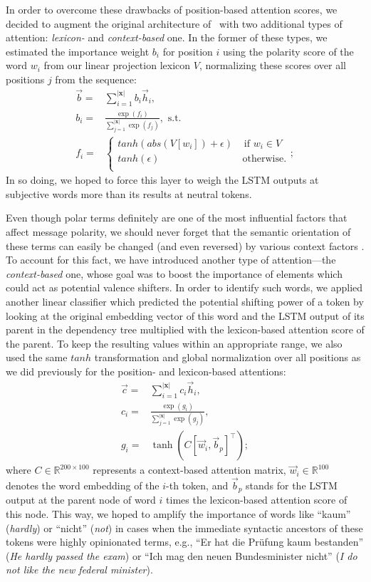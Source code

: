 In order to overcome these drawbacks of position-based attention
scores, we decided to augment the original architecture
of~\citet{Baziotis:17} with two additional types of attention:
\emph{lexicon-} and \emph{context-based} one.  In the former of these
types, we estimated the importance weight $b_i$ for position $i$ using
the polarity score of the word $w_i$ from our linear projection
lexicon $V$, normalizing these scores over all positions $j$ from the
sequence:
\begin{align*}
  \vec{b} =& \sum_{i=1}^{|\mathbf{x}|}b_i\vec{h}_i,\\
  b_i =& \frac{\exp(f_i)}{\sum_{j=1}^{|\mathbf{x}|}\exp(f_j)},\textrm{ s.t.}\\
  f_i =& \left\{
  \begin{array}{ll}
    tanh(abs(V[{w_i}]) + \epsilon) & \textrm{ if } w_i\in V\\
    tanh(\epsilon) & \, \textrm{otherwise.} \\
  \end{array}
  \right .;
\end{align*}
\noindent In so doing, we hoped to force this layer to weigh the LSTM
outputs at subjective words more than its results at neutral tokens.

Even though polar terms definitely are one of the most influential
factors that affect message polarity, we should never forget that the
semantic orientation of these terms can easily be changed (and even
reversed) by various context factors \cite[see][]{Polanyi:06}.  To
account for this fact, we have introduced another type of
attention---the \emph{context-based} one, whose goal was to boost the
importance of elements which could act as potential valence shifters.
In order to identify such words, we applied another linear classifier
which predicted the potential shifting power of a token by looking at
the original embedding vector of this word and the LSTM output of its
parent in the dependency tree multiplied with the lexicon-based
attention score of the parent.  To keep the resulting values within an
appropriate range, we also used the same $tanh$ transformation and
global normalization over all positions as we did previously for the
position- and lexicon-based attentions:
\begin{align*}
  \vec{c} =& \sum_{i=1}^{|\mathbf{x}|}c_i\vec{h}_i,\\ c_i =&
  \frac{\exp(g_i)}{\sum_{j=1}^{|\mathbf{x}|}\exp(g_j)},\\ g_i =&
  \tanh\left(C [\vec{w}_i, \vec{b}_p]^\top\right);
\end{align*}
where $C\in\mathbb{R}^{200 \times 100}$ represents a context-based
attention matrix, $\vec{w}_i \in \mathbb{R}^{100}$ denotes the word
embedding of the $i$-th token, and $\vec{b}_p$ stands for the LSTM
output at the parent node of word $i$ times the lexicon-based
attention score of this node.  This way, we hoped to amplify the
importance of words like ``kaum'' (\textit{hardly}) or ``nicht''
(\textit{not}) in cases when the immediate syntactic ancestors of
these tokens were highly opinionated terms, e.g., ``Er hat die
Pr\"ufung kaum bestanden'' (\textit{He hardly passed the exam}) or
``Ich mag den neuen Bundesminister nicht'' (\textit{I do not like the
  new federal minister}).

